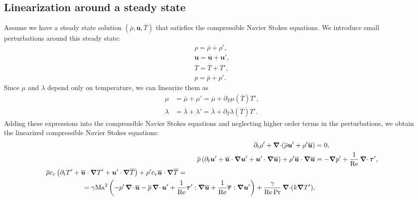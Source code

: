 \documentclass{article}
\begin{document}
\subsection{Linearization around a steady state}
Assume we have a steady state solution $(\overline{\rho}, \overline{\bm{u}}, \overline{T})$ that satisfies the compressible Navier Stokes equations. We introduce small perturbations around this steady state:
\begin{align*}
	\rho = \overline{\rho} + \rho',       \\
	\bm{u} = \overline{\bm{u}} + \bm{u}', \\
	T = \overline{T} + T',                \\
	p = \overline{p} + p'.
\end{align*}
Since $\mu$ and $\lambda$ depend only on temperature, we can linearize them as
\begin{align*}
	\mu     & = \overline{\mu} + \mu' = \overline{\mu} + \partial_T \mu (\overline{T}) T',                 \\
	\lambda & = \overline{\lambda} + \lambda' = \overline{\lambda} + \partial_T \lambda (\overline{T}) T'.
\end{align*}
Adding these expressions into the compressible Navier Stokes equations and neglecting higher order terms in the perturbations, we obtain the linearized compressible Navier Stokes equations:
\begin{align*}
	\partial_{t} \rho' + \divp (\overline{\rho} \bm{u}' + \rho' \overline{\bm{u}})                                                                                                          & = 0,                                            \\
	\overline{\rho}\left(\partial_{t} \bm{u}' + \overline{\bm{u}}\cdot \grad \bm{u}' + \bm{u}' \cdot \grad \overline{\bm{u}}\right) + \rho' \overline{\bm{u}} \cdot \grad \overline{\bm{u}} & = - \grad p' + \frac{1}{\Rey} \divp \bm{\tau}', \\
	\begin{split}
		\overline{\rho} c_v \left(\partial_{t} T' + \overline{\bm{u}} \cdot \grad T' + \bm{u}' \cdot \grad \overline{T}\right) + \rho' c_v \overline{\bm{u}} \cdot \grad \overline{T}
		 & = \\&\hspace{-5cm}=\gamma\Ma^2 \left(- p' \divp \overline{\bm{u}} - \overline{p} \divp \bm{u}' +\frac{1}{\Rey} \bm{\tau}' : \grad \overline{\bm{u}} + \frac{1}{\Rey} \overline{\bm{\tau}} : \grad \bm{u}'\right) + \frac{\gamma}{\Rey \Pr} \divp (k \grad T'),
	\end{split}
\end{align*}
\end{document}
